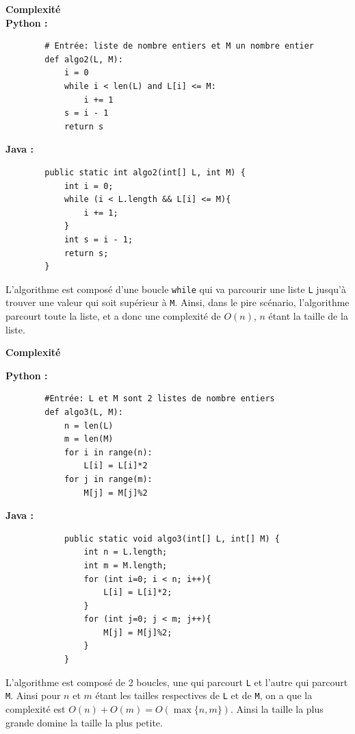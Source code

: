 \begin{Exercice}[10 minutes] \textbf{Complexité} \\
    \textbf{Python :}
    \begin{verbatim}
        # Entrée: liste de nombre entiers et M un nombre entier
        def algo2(L, M):
            i = 0
            while i < len(L) and L[i] <= M:
                i += 1
            s = i - 1
            return s
    \end{verbatim}
    
    \textbf{Java :}
    \begin{verbatim}
        public static int algo2(int[] L, int M) {
            int i = 0;
            while (i < L.length && L[i] <= M){
                i += 1;
            }
            int s = i - 1;
            return s;
        }
    \end{verbatim}
    \begin{solution}
    L'algorithme est composé d'une boucle \lstinline{while} qui va parcourir une liste \lstinline{L} jusqu'à trouver une valeur qui soit supérieur à \lstinline{M}. Ainsi, dans le pire scénario, l'algorithme parcourt toute la liste, et a donc une complexité de $O(n)$, $n$ étant la taille de la liste.
    \end{solution}
\end{Exercice}
\begin{Exercice}[10 minutes] \textbf{Complexité} \\

        \item \textbf{Python :}
        \begin{verbatim}
        #Entrée: L et M sont 2 listes de nombre entiers
        def algo3(L, M):
            n = len(L)
            m = len(M)
            for i in range(n):
                L[i] = L[i]*2
            for j in range(m):
                M[j] = M[j]%2
        \end{verbatim}
        
        \textbf{Java :}
        \begin{verbatim}
            public static void algo3(int[] L, int[] M) {
                int n = L.length;
                int m = M.length;
                for (int i=0; i < n; i++){
                    L[i] = L[i]*2;
                }
                for (int j=0; j < m; j++){
                    M[j] = M[j]%2;
                }
            }
        \end{verbatim}
        \begin{solution}
        L'algorithme est composé de 2 boucles, une qui parcourt \lstinline{L} et l'autre qui parcourt \lstinline{M}. Ainsi pour $n$ et $m$ étant les tailles respectives de \lstinline{L} et de \lstinline{M}, on a que la complexité est $O(n) + O(m) = O(\max\{n,m\})$. Ainsi la taille la plus grande domine la taille la plus petite.
        \end{solution}
\end{Exercice}
